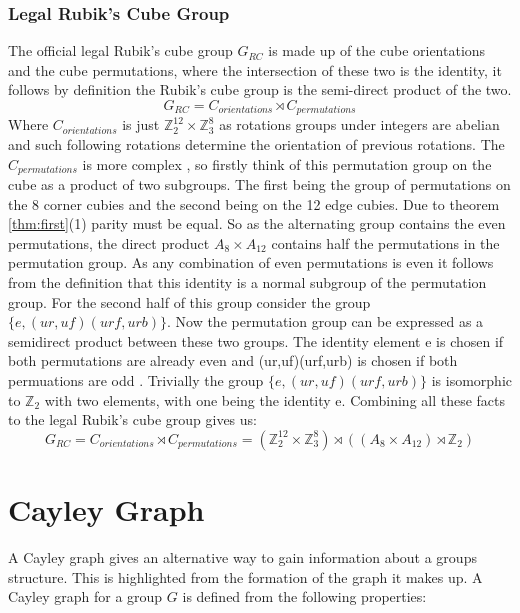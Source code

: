 \documentclass{article}
\newcounter{theo}[section]\setcounter{theo}{0}
\newcounter{prop}[section]\setcounter{prop}{0}
\newcounter{lem}[section]\setcounter{lem}{0}
\begin{document}
\subsubsection{Legal Rubik's Cube Group}

The official legal Rubik's cube group $G_{RC}$ is made up of the cube orientations and the cube permutations, where the intersection of these two is the identity, it follows by definition the Rubik's cube group is the semi-direct product of the two. 
\begin{equation}
G_{RC} = C_{orientations} \rtimes C_{permutations}
\end{equation}
Where $C_{orientations}$ is just $\mathbb{Z}_{2}^{12} \times \mathbb{Z}_{3}^{8}$ as rotations groups under integers are abelian and such following rotations determine the orientation of previous rotations. 
The $C_{permutations}$ is more complex , so firstly think of this permutation group on the cube as a product of two subgroups. The first being the group of permutations on the 8 corner cubies and the second being on the 12 edge cubies. Due to theorem \ref{thm:first}(1) parity must be equal. So as the alternating group contains the even permutations, the direct product $A_8 \times A_{12}$ contains half the permutations in the permutation group. As any combination of even permutations is even it follows from the definition that this identity is a normal subgroup of the permutation group.
For the second half of this group consider the group $\{e,(ur,uf)(urf,urb)\}$. Now the permutation group can be expressed as a semidirect product between these two groups. The identity element e is chosen if both permutations are already even and (ur,uf)(urf,urb) is chosen if both permuations are odd \cite{Final}. Trivially the group $\{e,(ur,uf)(urf,urb)\}$ is isomorphic to $\mathbb{Z}_2$ with two elements, with one being the identity e. Combining all these facts to the legal Rubik's cube group gives us: 
\begin{equation}
G_{RC} = C_{orientations} \rtimes C_{permutations} = (\mathbb{Z}_{2}^{12} \times \mathbb{Z}_{3}^{8}) \rtimes ((A_8 \times A_{12})\rtimes \mathbb{Z}_2)
\end{equation} 
\newpage
\section{Cayley Graph}
A Cayley graph gives an alternative way to gain information about a groups structure. This is highlighted from the formation of the graph it makes up. A Cayley graph for a group $G$ is defined from the following properties:
\end{document}
